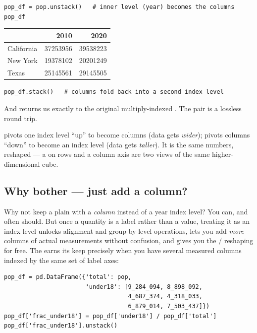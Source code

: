 \documentclass[11pt]{article}
\begin{document}
\begin{lstlisting}
pop_df = pop.unstack()   # inner level (year) becomes the columns
pop_df
\end{lstlisting}

\begin{center}
\renewcommand{\arraystretch}{1.2}
\begin{tabular}{l r r}
\toprule
 & \textbf{2010} & \textbf{2020} \\
\midrule
California & 37253956 & 39538223 \\
New York   & 19378102 & 20201249 \\
Texas      & 25145561 & 29145505 \\
\bottomrule
\end{tabular}
\end{center}

\begin{lstlisting}
pop_df.stack()   # columns fold back into a second index level
\end{lstlisting}

And  returns us exactly to the original multiply-indexed . The pair is a lossless round trip.

\begin{intuition}
 pivots one index level ``up'' to become columns (data gets \emph{wider});  pivots columns ``down'' to become an index level (data gets \emph{taller}). It is the same numbers, reshaped --- a  on rows and a column axis are two views of the same higher-dimensional cube.
\end{intuition}

\subsection{Why bother --- just add a column?}

Why not keep a plain  with a  \emph{column} instead of a year index level? You can, and often should. But once a quantity is a label rather than a value, treating it as an index level unlocks alignment and group-by-level operations, lets you add \emph{more} columns of actual measurements without confusion, and gives you the / reshaping for free. The  earns its keep precisely when you have several measured columns indexed by the same set of label axes:

\begin{lstlisting}
pop_df = pd.DataFrame({'total': pop,
                       'under18': [9_284_094, 8_898_092,
                                   4_687_374, 4_318_033,
                                   6_879_014, 7_503_437]})
pop_df['frac_under18'] = pop_df['under18'] / pop_df['total']
pop_df['frac_under18'].unstack()
\end{lstlisting}
\end{document}
